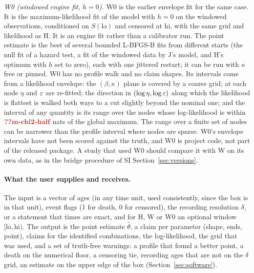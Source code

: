 \emph{W0 (windowed engine fit, $h=0$).} W0 is the earlier envelope fit for the same case. It is the maximum-likelihood fit of
the model with $h=0$ on the windowed observations, conditioned on $S(\mathrm{lo})$ and censored at $\mathrm{hi}$, with the same
grid and likelihood as H. It is an engine fit rather than a calibrator run. The point estimate is the best of several bounded
L-BFGS-B fits from different starts (the null fit of a hazard test, a fit of the windowed data by J's model, and H's optimum with
$h$ set to zero), each with one jittered restart; it can be run with $\kappa$ free or pinned. W0 has no profile walk and no claim
shapes. Its intervals come from a likelihood envelope: the $(\beta,\kappa)$ plane is covered by a coarse grid; at each node
$\eta$ and $\varepsilon$ are re-fitted; the direction in $(\log\eta,\log\varepsilon)$ along which the likelihood is flattest is walked both
ways to a cut slightly beyond the nominal one; and the interval of any quantity is its range over the nodes whose log-likelihood
is within $\C{m-chi2-half}$ nats of the global maximum. The range over a finite set of nodes can be narrower than the profile
interval where nodes are sparse. W0's envelope intervals have not been scored against the truth, and W0 is project code, not
part of the released package. A study that used W0 should compare it with W on its own data, as in the bridge procedure of SI
Section~\ref{sec:versions}.

\paragraph{What the user supplies and receives.} The input is a vector of ages (in any time unit, used consistently, since the
box is in that unit), event flags (1 for death, 0 for censored), the recording resolution $\delta$, or a statement that times are
exact, and for H, W or W0 an optional window $[\mathrm{lo},\mathrm{hi})$. The output is the point estimate $\hat\theta$, a claim per
parameter (shape, ends, point), claims for the identified combinations, the log-likelihood, the grid that was used, and a set of
truth-free warnings: a profile that found a better point, a death on the numerical floor, a censoring tie, recording ages that
are not on the $\delta$ grid, an estimate on the upper edge of the box (Section~\ref{sec:software}).

